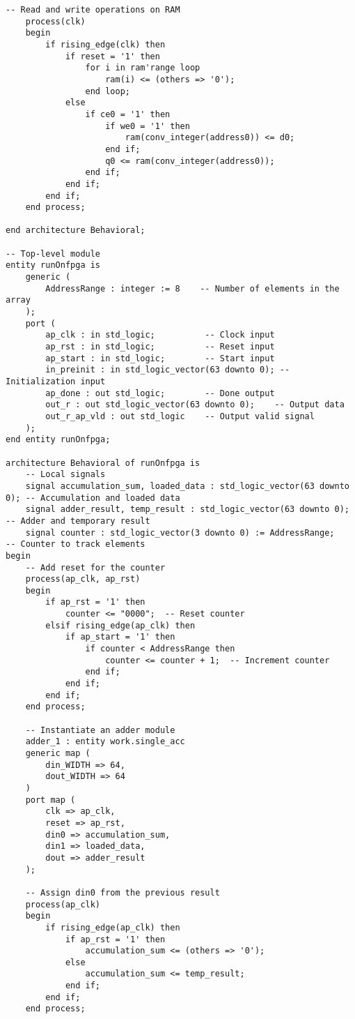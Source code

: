 \documentclass[12pt,american]{article}
\begin{document}
\begin{lstlisting}[style=vhdlStyle,caption=VHDL description of the Sequential Accumulator,label=lis:seq:RTL]
    -- Read and write operations on RAM
    process(clk)
    begin 
        if rising_edge(clk) then
            if reset = '1' then
                for i in ram'range loop
                    ram(i) <= (others => '0');
                end loop;
            else
                if ce0 = '1' then
                    if we0 = '1' then
                        ram(conv_integer(address0)) <= d0; 
                    end if;
                    q0 <= ram(conv_integer(address0));
                end if;
            end if;
        end if;
    end process;

end architecture Behavioral;

-- Top-level module
entity runOnfpga is
    generic (
        AddressRange : integer := 8    -- Number of elements in the array
    );
    port (
        ap_clk : in std_logic;          -- Clock input
        ap_rst : in std_logic;          -- Reset input
        ap_start : in std_logic;        -- Start input
        in_preinit : in std_logic_vector(63 downto 0); -- Initialization input
        ap_done : out std_logic;        -- Done output
        out_r : out std_logic_vector(63 downto 0);    -- Output data
        out_r_ap_vld : out std_logic    -- Output valid signal
    );
end entity runOnfpga;

architecture Behavioral of runOnfpga is
    -- Local signals
    signal accumulation_sum, loaded_data : std_logic_vector(63 downto 0); -- Accumulation and loaded data
    signal adder_result, temp_result : std_logic_vector(63 downto 0);     -- Adder and temporary result
    signal counter : std_logic_vector(3 downto 0) := AddressRange;        -- Counter to track elements
begin
    -- Add reset for the counter
    process(ap_clk, ap_rst)
    begin
        if ap_rst = '1' then
            counter <= "0000";  -- Reset counter
        elsif rising_edge(ap_clk) then
            if ap_start = '1' then
                if counter < AddressRange then
                    counter <= counter + 1;  -- Increment counter
                end if;
            end if;
        end if;
    end process;

    -- Instantiate an adder module
    adder_1 : entity work.single_acc
    generic map (
        din_WIDTH => 64,
        dout_WIDTH => 64
    )
    port map (
        clk => ap_clk,
        reset => ap_rst,
        din0 => accumulation_sum,
        din1 => loaded_data,
        dout => adder_result
    );

    -- Assign din0 from the previous result
    process(ap_clk)
    begin
        if rising_edge(ap_clk) then
            if ap_rst = '1' then
                accumulation_sum <= (others => '0');
            else
                accumulation_sum <= temp_result;
            end if;
        end if;
    end process;


\end{lstlisting}
\end{document}
